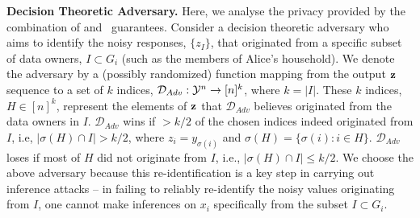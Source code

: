\newcommand{\Aunif}{\calA_{\text{unif}}}
\newcommand{\Ashuff}{\calA_{\text{shuff}}}
\newcommand{\Pzo}{P_{0 \rightarrow 1}}
\newcommand{\Poz}{P_{1 \rightarrow 0}}
\textbf{Decision Theoretic Adversary.} Here, we analyse the privacy provided by the combination of \ldp and \name~guarantees.
Consider a decision theoretic adversary who aims to identify the noisy responses, $\{z_I\}$, that originated from a specific subset of data owners, $I \subset G_i$ (such as the members of Alice's household). %
We denote the adversary by a (possibly randomized) function mapping from the output $\mathbf{z}$ sequence to a set of $k$ indices, $\mathcal{D}_{Adv}: \mathcal{Y}^n \rightarrow [n]^k$, where $k = |I|$. These $k$ indices, $H \in [n]^k$, represent the elements of $\mathbf{z}$ that $\mathcal{D}_{Adv}$ believes originated from the data owners in $I$. $\mathcal{D}_{Adv}$ wins if $> k/2$ of the chosen indices indeed originated from $I$, i.e,  $|\sigma(H) \cap I| > k/2 $, where $z_i = y_{\sigma(i)}$ and $\sigma(H) = \{\sigma(i) : i \in H\}$. $\mathcal{D}_{Adv}$ loses if most of $H$ did not originate from $I$, i.e.,  $|\sigma(H) \cap I| \leq k/2 $.
We choose the above adversary because this re-identification is a key step in carrying out inference attacks -- in failing to reliably re-identify the noisy values originating from $I$, one cannot make inferences on $x_i$ specifically from the subset $I \subset G_i$. 



